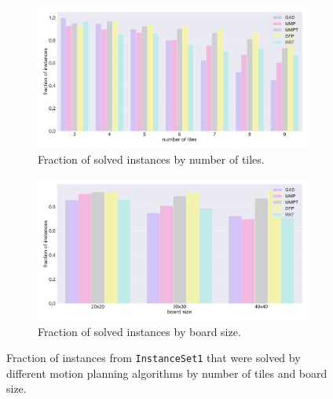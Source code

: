 \begin{figure}[htpb]
\begin{subfigure}[b]{\textwidth}
\centering
\includegraphics[width=\textwidth]{figures/plots/heuristic_solvers_i1/i1_fraction_solved_over_tiles.pdf}
\caption{Fraction of solved instances by number of tiles.}
\label{fig:i1_fraction_solved_over_tiles}
\end{subfigure}
\begin{subfigure}[b]{\textwidth}
\centering
\includegraphics[width=\textwidth]{figures/plots/heuristic_solvers_i1/i1_fraction_solved_over_board_size.pdf}
\caption{Fraction of solved instances by board size.}
\label{fig:i1_fraction_solved_over_board_size}
\end{subfigure}
\caption [Fraction of \texttt{InstanceSet1} solved by several planners] {Fraction of instances from \texttt{InstanceSet1} that were solved by different motion planning algorithms by number of tiles and board size.}
\label{fig:i1_performance2}
\end{figure}

